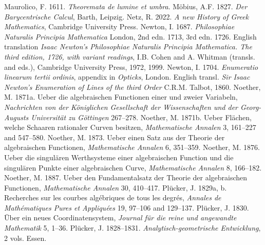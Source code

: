  \newline\indent Maurolico, F. 1611. \emph{Theoremata de lumine et umbra}. 
 \newline\indent M\"obius, A.F. 1827. \emph{Der Barycentrische Calcul}, Barth, Leipzig.
 \newline\indent  Netz, R. 2022. \emph{A new History of Greek Mathematics}, Cambridge University Press.
\newline\indent Newton, I. 1687. \emph{Philosophiae  Naturalis Principia Mathematica} London, 2nd edn. 1713, 3rd edn. 1726. English translation \emph{Isaac Newton's Philosophiae Naturalis Principia Mathematica. The third edition, 1726, with variant readings}, I.B. Cohen and A. Whitman (transls. and eds.), Cambridge University Press, 1972, 1999.
\newline\indent Newton, I. 1704. \emph{Enumeratio linearum tertii ordinis}, appendix in \emph{Opticks}, London. English transl. \emph{Sir Isaac Newton's Enumeration of Lines of the third Order} C.R.M. Talbot, 1860.
\newline\indent Noether, M. 1871a. Ueber die algebraischen Functionen einer und zweier Variabeln, \emph{Nachrichten von der K\"oniglichen Gesellschaft der Wissenschaften und der Georg-Augusts Universit\"at zu G\"ottingen} 267--278.
\newline\indent Noether, M. 1871b. Ueber Fl\"achen, welche Schaaren rationaler Curven besitzen, \emph{Mathematische  Annalen} 3,   161--227 and 547--580.
\newline\indent Noether, M. 1873. Ueber einen Satz aus der Theorie der algebraischen Functionen, \emph{Mathematische Annalen} 6, 351--359.
\newline\indent Noether, M. 1876.  Ueber die singul\"aren Werthsysteme einer algebraischen Function und die singul\"aren Punkte einer algebraischen Curve, \emph{Mathematische  Annalen} 8, 166--182.
\newline\indent Noether, M. 1887. Ueber den Fundamentalsatz der Theorie der
algebraischen Functionen,  \emph{Mathematische Annalen} 30, 410--417. 
\newline\indent Pl\"ucker, J. 1829a, b. Recherches sur les courbes alg\'ebriques de tous les degr\'es, \emph{Annales de Math\'e\-matiques Pures et Appliqu\'ees} 19, 97--106 and 129--137.
\newline\indent Pl\"ucker, J. 1830. \"Uber ein neues Coordinatensystem, \emph{Journal f\"ur die reine und angewandte Mathematik} 5, 1--36.
\newline\indent Pl\"ucker, J. 1828--1831.  \emph{Analytisch-geometrische Entwicklung}, 2 vols. Essen. 
